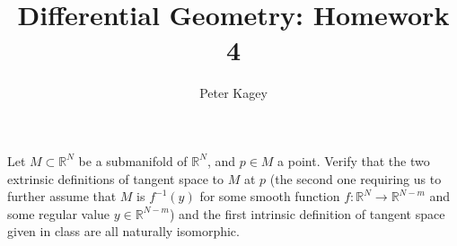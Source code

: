 \documentclass{article}
\newenvironment{problem}[2][Problem]{\begin{trivlist}
\item[\hskip \labelsep {\bfseries #1}\hskip \labelsep {\bfseries #2.}]}{\end{trivlist}}
\begin{document}
\title{Differential Geometry: Homework 4}
\author{Peter Kagey}

\maketitle

\begin{problem}{1}
  Let $M \subset \mathbb{R}^N$ be a submanifold of $\mathbb{R}^N$, and $p \in M$
  a point. Verify that the two extrinsic definitions of tangent space to $M$ at
  $p$ (the second one requiring us to further assume that $M$ is $f^{-1}(y)$ for
  some smooth function $f\colon \mathbb{R}^N \rightarrow \mathbb{R}^{N-m}$ and
  some regular value $y \in \mathbb{R}^{N-m}$) and the first intrinsic
  definition of tangent space given in class are all naturally isomorphic.
\end{problem}
\end{document}
